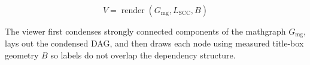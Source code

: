 \begin{equation}
V=\operatorname{render}(G_{\mathrm{mg}},L_{\mathrm{SCC}},B)
\label{deriv:render-graph-view}
\end{equation}

The viewer first condenses strongly connected components of the mathgraph \(G_{\mathrm{mg}}\), lays out the condensed DAG, and then draws each node using measured title-box geometry \(B\) so labels do not overlap the dependency structure.
